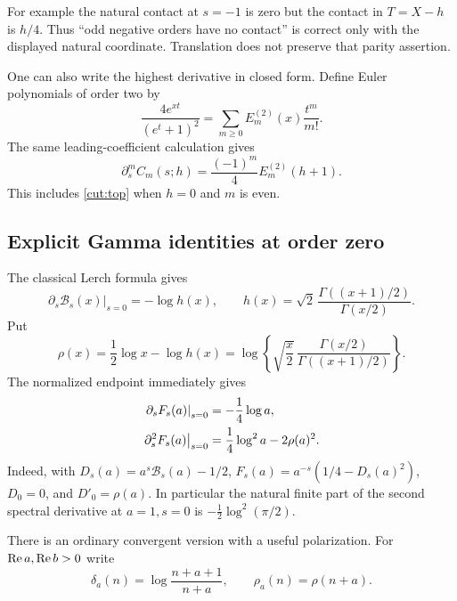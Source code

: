 For example the natural contact at $s=-1$ is zero but the contact in
$T=X-h$ is $h/4$. Thus ``odd negative orders have no contact'' is
correct only with the displayed natural coordinate. Translation does
not preserve that parity assertion.

One can also write the highest derivative in closed form. Define
Euler polynomials of order two by
\[
 \frac{4e^{xt}}{(e^t+1)^2}
 =\sum_{m\ge0}E_m^{(2)}(x)\frac{t^m}{m!}.
\]
The same leading-coefficient calculation gives
\begin{equation}\label{cut:translatedtop}
 \partial_s^m C_m(s;h)=\frac{(-1)^m}{4}E_m^{(2)}(h+1).
\end{equation}
This includes \eqref{cut:top} when $h=0$ and $m$ is even.

\subsection{Explicit Gamma identities at order zero}

The classical Lerch formula gives
\begin{equation}\label{cut:Lerch}
 \left.\partial_s\mathcal B_s(x)\right|_{s=0}
 =-\log h(x),\qquad
 h(x)=\sqrt2\,\frac{\Gamma((x+1)/2)}{\Gamma(x/2)}.
\end{equation}
Put
\begin{equation}\label{cut:rho}
 \rho(x)=\frac12\log x-\log h(x)
 =\log\left\{\sqrt{\frac{x}{2}}\,
          \frac{\Gamma(x/2)}{\Gamma((x+1)/2)}\right\}.
\end{equation}
The normalized endpoint immediately gives
\begin{align}
 \left.\partial_sF_s(a)\right|_{s=0}
    &=-\frac14\log a,\label{cut:Fzero}\\
 \left.\partial_s^2F_s(a)\right|_{s=0}
    &=\frac14\log^2a-2\rho(a)^2.\notag
\end{align}
Indeed, with $D_s(a)=a^s\mathcal B_s(a)-1/2$,
$F_s(a)=a^{-s}(1/4-D_s(a)^2)$, $D_0=0$, and $D'_0=\rho(a)$.
In particular the natural finite part of the second spectral derivative
at $a=1,s=0$ is $-\tfrac12\log^2(\pi/2)$.

There is an ordinary convergent version with a useful polarization.
For $\operatorname{Re} a,\operatorname{Re} b>0$ write
\[
 \delta_a(n)=\log\frac{n+a+1}{n+a},\qquad
 \rho_a(n)=\rho(n+a).
\]

